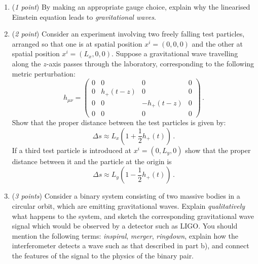 \documentclass[12pt]{article}
\newcommand{\be}{\begin{equation}}
\newcommand{\ee}{\end{equation}}
\begin{document}
\begin{enumerate}[label=\alph*)]
\item (\emph{1 point}) By making an appropriate gauge choice, explain why the linearised Einstein equation leads to \emph{gravitational waves}.
\item (\emph{2 point}) Consider an experiment involving two freely falling test particles, arranged so that one is at spatial position $x^i = (0,0,0)$ and the other at spatial position $x^i=(L_x,0,0)$.
Suppose a gravitational wave travelling along the $z$-axis passes through the laboratory, corresponding to the following metric perturbation:
\be
h_{\mu\nu} = \begin{pmatrix}
0 & 0 & 0 & 0 \\
0 & h_{+}(t-z) & 0 & 0 \\
0 & 0 & - h_{+}(t-z) & 0 \\
0 & 0 & 0 & 0
\end{pmatrix} \,.
\ee
Show that the proper distance between the test particles is given by: 
\be
\Delta s \approx L_x \left( 1 + \frac{1}{2} h_{+}(t) \right) \,.
\ee
If a third test particle is introduced at $x^i=(0,L_y,0)$ show that the proper distance between it and the particle at the origin is
\be
\Delta s \approx L_y \left( 1 - \frac{1}{2} h_{+}(t) \right) \,.
\ee
\item (\emph{3 points}) Consider a binary system consisting of two massive bodies in a circular orbit, which are emitting gravitational waves.
Explain \emph{qualitatively} what happens to the system, and sketch the corresponding gravitational wave signal which would be observed by a detector such as LIGO.
You should mention the following terms: \emph{inspiral}, \emph{merger}, \emph{ringdown}, explain how the interferometer detects a wave such as that described in part b), and connect the features of the signal to the physics of the binary pair. 

\end{enumerate}
\end{document}
